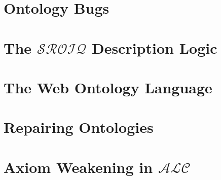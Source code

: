 \section{Ontology Bugs} \label{ontology-bugs}



\section{The \texorpdfstring{$\mathcal{SROIQ}$}{SROIQ} Description Logic} \label{sroiq-def}



\section{The Web Ontology Language} \label{owl-def}



\section{Repairing Ontologies} \label{ontology-repair}



\section{Axiom Weakening in \texorpdfstring{$\mathcal{ALC}$}{ALC}} \label{weakening-alc}


